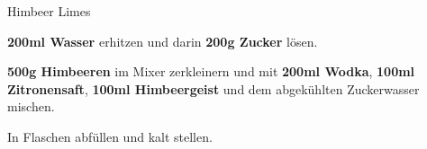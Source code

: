 \begin{recipe}[]{Himbeer Limes} %

\step
\textbf{200ml Wasser} erhitzen und darin \textbf{200g Zucker} lösen.

\step
\textbf{500g Himbeeren} im Mixer zerkleinern und mit \textbf{200ml Wodka}, \textbf{100ml Zitronensaft}, \textbf{100ml Himbeergeist} und dem abgekühlten Zuckerwasser mischen.

\step
In Flaschen abfüllen und kalt stellen.

\end{recipe}